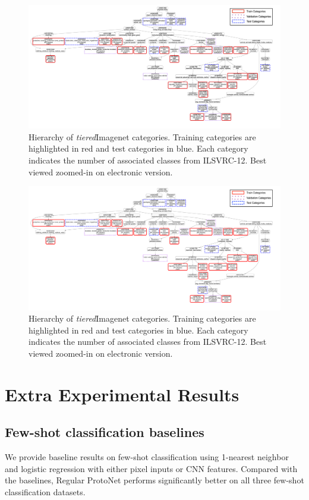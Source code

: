 \iflatexml
\begin{figure}[ht]
    \includegraphics[width=8\textwidth]{figures/hierarchy_legend_val.png}
    \caption{Hierarchy of \textit{tiered}Imagenet categories. Training categories are highlighted in red and test categories in blue. Each category indicates the number of associated classes from ILSVRC-12. Best viewed zoomed-in on electronic version.}
    \label{fig:tiered_hierarchy}
\end{figure}
\else
\begin{figure}
    \includegraphics[width=\textwidth]{figures/hierarchy_legend_val.pdf}
    \caption{Hierarchy of \textit{tiered}Imagenet categories. Training categories are highlighted in red and test categories in blue. Each category indicates the number of associated classes from ILSVRC-12. Best viewed zoomed-in on electronic version.}
    \label{fig:tiered_hierarchy}
\end{figure}
\fi

\section{Extra Experimental Results}
\subsection{Few-shot classification baselines}
We provide baseline results on few-shot classification using 1-nearest neighbor and logistic
regression with either pixel inputs or CNN features. Compared with the baselines, Regular ProtoNet
performs significantly better on all three few-shot classification datasets.

